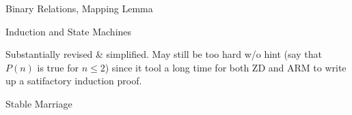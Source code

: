 \documentclass[quiz]{mcs}
\begin{document}



\iffalse
\begin{center}
{\Large DRAFT}
\end{center}
\fi

\begin{staffnotes}
\begin{center}
{\large Binary Relations, Mapping Lemma}
\end{center}
\end{staffnotes}

%

\begin{staffnotes}
\begin{center}
{\large Induction and State Machines}
\end{center}
\end{staffnotes}


\begin{staffnotes}
Substantially revised \& simplified.  May still be too hard w/o hint
(say that $P(n)$ is true for $n \leq 2$) since it tool a long time for
both ZD and ARM to write up a satifactory induction proof.
\end{staffnotes}


%
%
%
%

\begin{staffnotes}
\begin{center}
{\large Stable Marriage}
\end{center}
\end{staffnotes}
\end{document}
